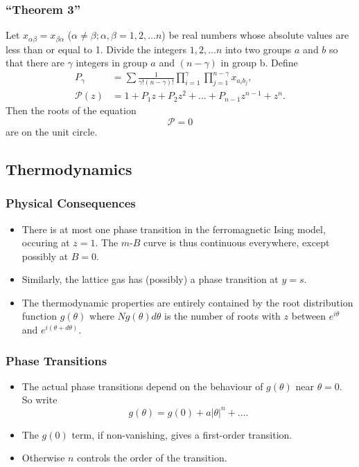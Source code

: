 \documentclass[british]{beamer}
\begin{document}
\frame
{
  \frametitle{``Theorem 3''}

  Let $x_{\alpha \beta}=x_{\beta \alpha}$ ($\alpha \neq \beta; \alpha, \beta = 1,2,\ldots n$) be real numbers whose absolute values are less than or equal to 1. Divide the integers $1,2,\ldots n$ into two groups $a$ and $b$ so that there are $\gamma$ integers in group $a$ and $(n-\gamma)$ in group b. Define 
  \begin{align*}
  P_\gamma &= \sum \frac{1}{\gamma! (n-\gamma)!} \prod_{i=1}^{\gamma} \prod_{j=1}^{n-\gamma} x_{{a_i} {b_j}}, \\
  \mathcal{P}(z) &= 1+P_1 z + P_2 z^2 + \ldots + P_{n-1} z^{n-1} + z^n.
  \end{align*}
  Then the roots of the equation $$\mathcal{P}=0$$ are on the unit circle.

}

\subsection{Thermodynamics}
\frame
{
  \frametitle{Physical Consequences}

  \begin{itemize}
  \item<1-> There is at most one phase transition in the ferromagnetic Ising model, occuring at $z=1$. The $m$-$B$ curve is thus continuous everywhere, except possibly at $B=0$.
  \item<2-> Similarly, the lattice gas has (possibly) a phase transition at $y=s$. 
  \item<3-> The thermodynamic properties are entirely contained by the root distribution function $g(\theta)$ where $N g(\theta) d\theta$ is the number of roots with $z$ between $e^{i\theta}$ and $e^{i(\theta+d\theta)}$.
  \end{itemize}
}

\frame
{
  \frametitle{Phase Transitions}

  \begin{itemize}
  \item The actual phase transitions depend on the behaviour of $g(\theta)$ near $\theta = 0$. So write $$g(\theta) = g(0) + a\left|\theta\right|^n+\ldots.$$
  \item The $g(0)$ term, if non-vanishing, gives a first-order transition.
  \item Otherwise $n$ controls the order of the transition.
  \end{itemize}
}
\end{document}
